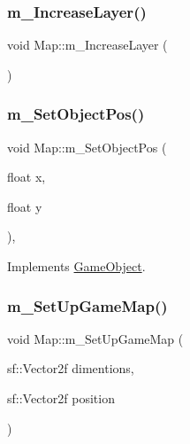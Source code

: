 \mbox{\label{class_map_ae0ac864d328f94d30096184eb71e85cf}} 
\subsubsection{\texorpdfstring{m\+\_\+\+Increase\+Layer()}{m\_IncreaseLayer()}}
{\footnotesize\ttfamily void Map\+::m\+\_\+\+Increase\+Layer (\begin{DoxyParamCaption}{ }\end{DoxyParamCaption})}

\mbox{\label{class_map_aa44fadcea160127a186720c1ff44e533}} 
\subsubsection{\texorpdfstring{m\+\_\+\+Set\+Object\+Pos()}{m\_SetObjectPos()}}
{\footnotesize\ttfamily void Map\+::m\+\_\+\+Set\+Object\+Pos (\begin{DoxyParamCaption}\item[{float}]{x,  }\item[{float}]{y }\end{DoxyParamCaption})\hspace{0.3cm}{\ttfamily [override]}, {\ttfamily [virtual]}}



Implements \mbox{\hyperlink{class_game_object_ad1f8ea8eb3673b1af8215bf92cdc0df8}{Game\+Object}}.

\mbox{\label{class_map_a0f3b846f14a87030cf53d6fd32072cda}} 
\subsubsection{\texorpdfstring{m\+\_\+\+Set\+Up\+Game\+Map()}{m\_SetUpGameMap()}}
{\footnotesize\ttfamily void Map\+::m\+\_\+\+Set\+Up\+Game\+Map (\begin{DoxyParamCaption}\item[{sf\+::\+Vector2f}]{dimentions,  }\item[{sf\+::\+Vector2f}]{position }\end{DoxyParamCaption})}

